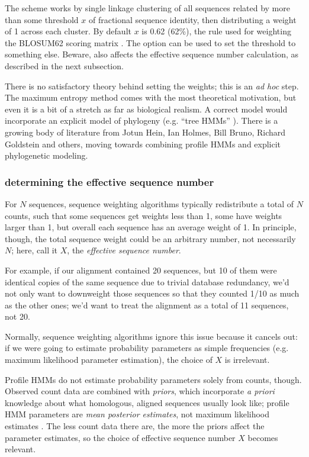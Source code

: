 The  scheme works by single linkage clustering of all
sequences related by more than some threshold $x$ of fractional
sequence identity, then distributing a weight of 1 across each
cluster. By default $x$ is 0.62 (62\%), the rule used for weighting
the BLOSUM62 scoring matrix \cite{Henikoff92}. The  option can be used to set the threshold to something else.
Beware,  also affects the effective sequence number
calculation, as described in the next subsection.

There is no satisfactory theory behind setting the weights; this is an
\emph{ad hoc} step. The maximum entropy method comes with the most
theoretical motivation, but even it is a bit of a stretch as far as
biological realism. A correct model would incorporate an explicit
model of phylogeny (e.g. ``tree HMMs'' \cite{Mitchison95}). There is a
growing body of literature from Jotun Hein, Ian Holmes, Bill Bruno,
Richard Goldstein and others, moving towards combining profile HMMs
and explicit phylogenetic modeling.

\subsubsection{determining the effective sequence number}

For $N$ sequences, sequence weighting algorithms typically
redistribute a total of $N$ counts, such that some sequences get
weights less than 1, some have weights larger than 1, but overall each
sequence has an average weight of 1. In principle, though, the total
sequence weight could be an arbitrary number, not necessarily $N$;
here, call it $X$, the \emph{effective sequence number}. 

For example, if our alignment contained 20 sequences, but 10 of them
were identical copies of the same sequence due to trivial database
redundancy, we'd not only want to downweight those sequences so that
they counted 1/10 as much as the other ones; we'd want to treat the
alignment as a total of 11 sequences, not 20.

Normally, sequence weighting algorithms ignore this issue because it
cancels out: if we were going to estimate probability parameters as
simple frequencies (e.g. maximum likelihood parameter estimation), the
choice of $X$ is irrelevant.

Profile HMMs do not estimate probability parameters solely from
counts, though. Observed count data are combined with \emph{priors},
which incorporate \emph{a priori} knowledge about what homologous,
aligned sequences usually look like; profile HMM parameters are
\emph{mean posterior estimates}, not maximum likelihood estimates
\cite{Durbin98,Sjolander96}. The less count data there are, the more
the priors affect the parameter estimates, so the choice of effective
sequence number $X$ becomes relevant.

